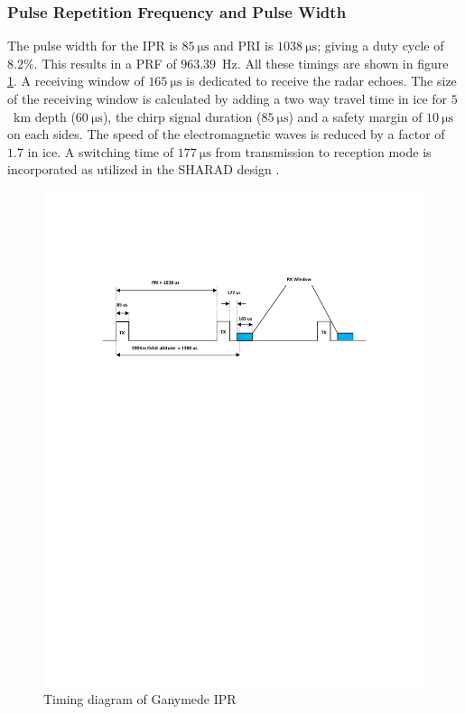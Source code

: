 \subsubsection{Pulse Repetition Frequency and Pulse Width}
The pulse width for the \ac{IPR} is $85 \mathrm{~\mu s} $ and \ac{PRI} is $1038 \mathrm{~\mu s}$; giving a duty cycle of $8.2\% $. This results in a \ac{PRF} of $963.39$~Hz. All these timings are shown in figure \ref{fig:PRI}. A receiving window of $165 \mathrm{~\mu s}$ is dedicated to receive the radar echoes. The size of the receiving window is calculated by adding a two way travel time in ice for $5$~km depth ($60 \mathrm{~\mu s}$), the chirp signal duration ($85\mathrm{~\mu s}$) and  a safety margin of $10 \mathrm{~\mu s}$ on each sides. The speed of the electromagnetic waves is reduced by a factor of $1.7$ in ice. A switching time of $177 \mathrm{~\mu s}$ from transmission to reception mode is incorporated as utilized in the \ac{SHARAD} design \cite{SHARAD}.
%
\begin{figure}[bht]
\centering
\includegraphics[scale=1]{Figures/PRI.pdf}
\caption{Timing diagram of Ganymede \ac{IPR}} 
\label{fig:PRI}
\end{figure}
%

